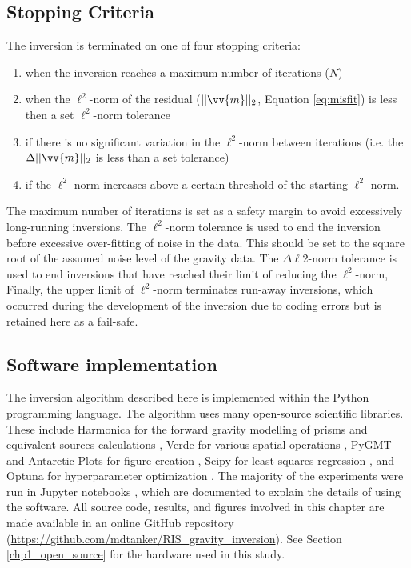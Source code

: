 \subsection{Stopping Criteria} \label{chp3:stopping_criteria}

The inversion is terminated on one of four stopping criteria:

\begin{enumerate}
    \item when the inversion reaches a maximum number of iterations ($N$)
    \item when the $\ell^2$-norm of the residual ($||\vv{m}||_2$, Equation \ref{eq:misfit}) is less then a set $\ell^2$-norm tolerance
    \item if there is no significant variation in the $\ell^2$-norm between iterations (i.e. the $\Delta||\vv{m}||_2$ is less than a set tolerance)
    \item if the $\ell^2$-norm increases above a certain threshold of the starting $\ell^2$-norm. 
\end{enumerate}
The maximum number of iterations is set as a safety margin to avoid excessively long-running inversions. The $\ell^2$-norm tolerance is used to end the inversion before excessive over-fitting of noise in the data. This should be set to the square root of the assumed noise level of the gravity data. The $\Delta\ell$2-norm tolerance is used to end inversions that have reached their limit of reducing the $\ell^2$-norm, Finally, the upper limit of $\ell^2$-norm terminates run-away inversions, which occurred during the development of the inversion due to coding errors but is retained here as a fail-safe. 

\subsection{Software implementation}

The inversion algorithm described here is implemented within the Python programming language. The algorithm uses many open-source scientific libraries. These include Harmonica for the forward gravity modelling of prisms and equivalent sources calculations \citep{fatiandoaterraprojectharmonica2023, solergradientboosted2021}, Verde for various spatial operations \citep{uiedaverde2018}, PyGMT and Antarctic-Plots for figure creation \citep{uiedapygmt2021, tankersleyantarctic2023}, Scipy for least squares regression \citep{2020SciPy-NMeth}, and Optuna for hyperparameter optimization \citep{akibaoptuna2019}. The majority of the experiments were run in Jupyter notebooks \citep{pérezipython2007}, which are documented to explain the details of using the software. All source code, results, and figures involved in this chapter are made available in an online GitHub repository (\url{https://github.com/mdtanker/RIS_gravity_inversion}). See Section \ref{chp1_open_source} for the hardware used in this study.

